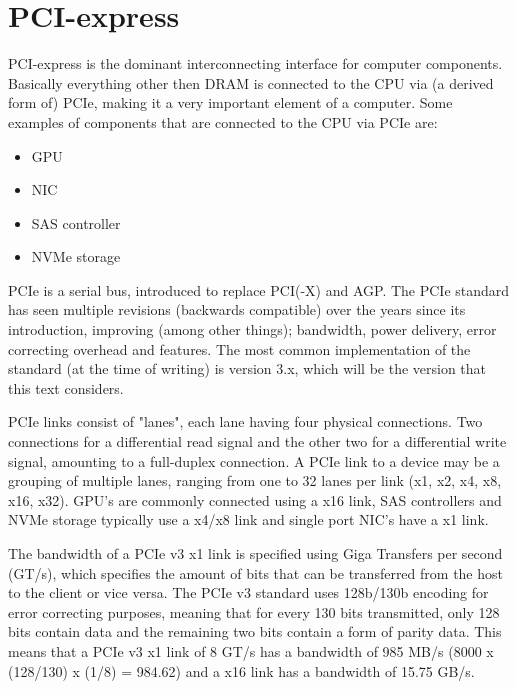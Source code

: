 \section{PCI-express}

\hspace{4mm}PCI-express is the dominant interconnecting interface for computer components\autocite[]{wiki_pcie}. Basically everything other then DRAM is connected to the CPU via (a derived form of) PCIe, making it a very important element of a computer. Some examples of components that are connected to the CPU via PCIe are:

\begin{itemize}
    \item GPU
    \item NIC
    \item SAS controller
    \item NVMe storage
\end{itemize}

PCIe is a serial bus, introduced to replace PCI(-X)\autocite[]{wiki_pci} and AGP\autocite[]{wiki_agp}. The PCIe standard has seen multiple revisions (backwards compatible) over the years since its introduction, improving (among other things); bandwidth, power delivery, error correcting overhead and features. The most common implementation of the standard (at the time of writing) is version 3.x, which will be the version that this text considers.\vspace{5mm}

PCIe links consist of "lanes", each lane having four physical connections. Two connections for a differential read signal and the other two for a differential write signal, amounting to a full-duplex connection. A PCIe link to a device may be a grouping of multiple lanes, ranging from one to 32 lanes per link (x1, x2, x4, x8, x16, x32). GPU's are commonly connected using a x16 link, SAS controllers and NVMe storage typically use a x4/x8 link and single port NIC's have a x1 link.\vspace{5mm} 

The bandwidth of a PCIe v3 x1 link is specified using Giga Transfers per second (GT/s), which specifies the amount of bits that can be transferred from the host to the client or vice versa. The PCIe v3 standard uses 128b/130b encoding for error correcting purposes, meaning that for every 130 bits transmitted, only 128 bits contain data and the remaining two bits contain a form of parity data. This means that a PCIe v3 x1 link of 8 GT/s has a bandwidth of 985 MB/s (8000 x (128/130) x (1/8) = 984.62) and a x16 link has a bandwidth of 15.75 GB/s.

